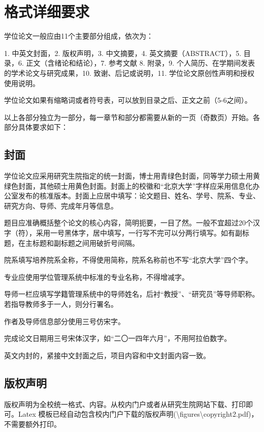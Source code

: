 \chapter{格式详细要求}
学位论文一般应由11个主要部分组成，依次为：

1. 中英文封面，2. 版权声明，3. 中文摘要，4. 英文摘要（ABSTRACT），5. 目录，6. 正文（含绪论和结论），7. 参考文献 8. 附录，9. 个人简历、在学期间发表的学术论文与研究成果，10. 致谢、后记或说明，11. 学位论文原创性声明和授权使用说明。

学位论文如果有缩略词或者符号表，可以放到目录之后、正文之前（5-6之间）。

以上各部分独立为一部分，每一章节和部分都需要从新的一页（奇数页）开始。各部分具体要求如下：


\section{封面}
学位论文应采用研究生院指定的统一封面，博士用青绿色封面，同等学力硕士用黄绿色封面，其他硕士用黄色封面。封面上的校徽和“北京大学”字样应采用信息化办公室发布的核准版本。封面上应居中填写：论文题目、姓名、学号、院系、专业、研究方向、导师、完成年月等信息。

题目应准确概括整个论文的核心内容，简明扼要，一目了然。一般不宜超过20个汉字（符），采用一号黑体字，居中填写，一行写不完可以分两行填写。如有副标题，在主标题和副标题之间用破折号间隔。

院系填写培养院系全称，不得使用简称，院系名称前也不写“北京大学”四个字。

专业应使用学位管理系统中标准的专业名称，不得增减字。

导师一栏应填写学籍管理系统中的导师姓名，后衬“教授”、“研究员”等导师职称。若指导教师多于一人，则分行署名。

作者及导师信息部分使用三号仿宋字。

完成论文日期用三号宋体汉字，如“二〇一四年六月”，不用阿拉伯数字。

英文内封的，紧接中文封面之后，项目内容和中文封面内容一致。

\section{版权声明}
版权声明为全校统一格式、内容。从校内门户或者从研究生院网站下载、打印即可。Latex 模板已经自动包含校内门户下载的版权声明(\textbackslash figures\textbackslash copyright2.pdf)，不需要额外打印。


